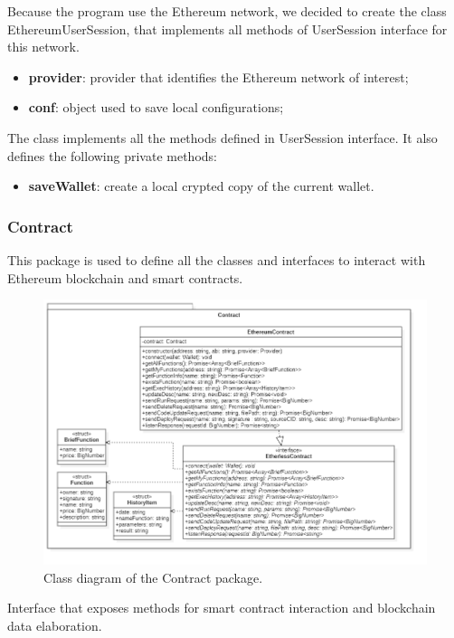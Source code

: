 			Because the program use the Ethereum network, we decided to create the class EthereumUserSession, that implements all methods of UserSession interface for this network.
					\begin{itemize}
						\item \textbf{provider}: provider that identifies the Ethereum network of interest; 
						\item \textbf{conf}: object used to save local configurations;
					\end{itemize}
				
				The class implements all the methods defined in UserSession interface. It also defines the following private methods: 
					\begin{itemize}
						\item\textbf{saveWallet}: create a local crypted copy of the current wallet. 
					\end{itemize}
				
		\subsubsection{Contract} 
		This package is used to define all the classes and interfaces to interact with Ethereum blockchain and smart contracts. 
		\begin{figure} [h!]
			\centering
			\includegraphics[width=0.75\linewidth]{diagrammi/etherless-cli/Contract}
			\caption{Class diagram of the Contract package.}
		\end{figure}
	
			Interface that exposes methods for smart contract interaction and blockchain data elaboration. 	
			
